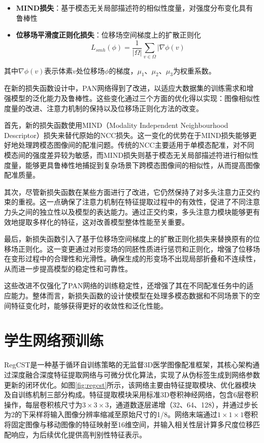 \begin{itemize}
    \item \textbf{MIND损失}：基于模态无关局部描述符的相似性度量，对强度分布变化具有鲁棒性

    \item \textbf{位移场平滑度正则化损失}：位移场空间梯度上的扩散正则化
          \begin{equation}
              L_{smh}(\phi)=\frac{1}{|\Omega|}\sum_{v\in\Omega}|\nabla \phi(v)
          \end{equation}

\end{itemize}

其中$\nabla \phi(v)$表示体素$v$处位移场$\phi$的梯度，$\mu_1$、$\mu_2$、$\mu_3$为权重系数。

在新的损失函数设计中，PAN网络得到了改进，以适应大数据集的训练需求和增强模型的泛化能力及鲁棒性。这些变化通过三个方面的优化得以实现：图像相似性度量的改进、注意力机制的保持以及位移场正则化方法的改变。

首先，新的损失函数使用MIND（Modality Independent Neighbourhood Descriptor）损失来替代原始的NCC损失。这一变化的优势在于MIND损失能够更好地处理跨模态图像间的配准问题。传统的NCC主要适用于单模态配准，对不同模态间的强度差异较为敏感，而MIND损失则基于模态无关局部描述符进行相似性度量，能够更具鲁棒性地捕捉到复杂场景下跨模态图像间的相似性，从而提高图像配准质量。

其次，尽管新损失函数在某些方面进行了改进，它仍然保持了对多头注意力正交约束的重视。这一点确保了注意力机制在特征提取过程中的有效性，促进了不同注意力头之间的独立性以及模型的表达能力。通过正交约束，多头注意力模块能够更有效地提取多样化的特征，这对改善模型整体性能至关重要。

最后，新损失函数引入了基于位移场空间梯度上的扩散正则化损失来替换原有的位移场正则化。这一变更通过对形变场的同胚性质进行惩罚和正则化，增强了位移场在变形过程中的合理性和光滑性。确保生成的形变场不出现局部折叠和不连续性，从而进一步提高模型的稳定性和可靠性。

这些改进不仅强化了PAN网络的训练稳定性，还增强了其在不同配准任务中的适应能力。整体而言，新损失函数的设计使模型在处理多模态数据和不同场景下的空间特征变化时，能够获得更好的收敛性和泛化性能。


\section{学生网络预训练}

RegCST\cite{bigalke2023unsupervised}是一种基于循环自训练策略的无监督3D医学图像配准框架，其核心架构通过深度融合深度特征提取网络与可微分优化算法，实现了从伪标签生成到网络参数更新的闭环优化。如图\ref{fig:regcst}所示，该网络主要由特征提取模块、优化器模块及自训练机制三部分构成。特征提取模块采用标准3D卷积神经网络，包含6层卷积操作，每层卷积核尺寸为$3 \times 3 \times 3$，通道数逐层递增（32、64、128），并通过步长为2的下采样将输入图像分辨率缩减至原始尺寸的1/8。网络末端通过$1 \times 1 \times 1$卷积将固定图像与移动图像的特征映射至16维空间，并输入相关性层计算多尺度位移匹配响应，为后续优化提供高判别性特征表示。

